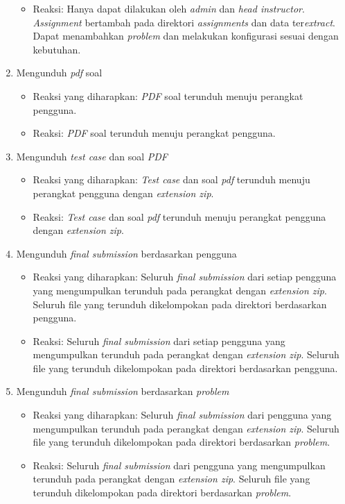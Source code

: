 \begin{enumerate}
\begin{itemize}
	 	\item Reaksi: Hanya dapat dilakukan oleh \textit{admin} dan \textit{head instructor}. \textit{Assignment} bertambah pada direktori \textit{assignments} dan data ter\textit{extract}. Dapat menambahkan \textit{problem} dan melakukan konfigurasi sesuai dengan kebutuhan.
	 \end{itemize}
	 \item Mengunduh \textit{pdf} soal
	 \begin{itemize}
	 	\item Reaksi yang diharapkan: \textit{PDF} soal terunduh menuju perangkat pengguna.
	 	\item Reaksi: \textit{PDF} soal terunduh menuju perangkat pengguna.
	 \end{itemize}
	 \item Mengunduh \textit{test case} dan soal \textit{PDF}
	 \begin{itemize}
	 	\item Reaksi yang diharapkan: \textit{Test case} dan soal \textit{pdf} terunduh menuju perangkat pengguna dengan \textit{extension zip}.
	 	\item Reaksi: \textit{Test case} dan soal \textit{pdf} terunduh menuju perangkat pengguna dengan \textit{extension zip}.
	 \end{itemize}
	 \item Mengunduh \textit{final submission} berdasarkan pengguna
	 \begin{itemize}
	 	\item Reaksi yang diharapkan: Seluruh \textit{final submission} dari setiap pengguna yang mengumpulkan terunduh pada perangkat dengan \textit{extension zip}. Seluruh file yang terunduh dikelompokan pada direktori berdasarkan pengguna.
	 	\item Reaksi: Seluruh \textit{final submission} dari setiap pengguna yang mengumpulkan terunduh pada perangkat dengan \textit{extension zip}. Seluruh file yang terunduh dikelompokan pada direktori berdasarkan pengguna.
	 \end{itemize}
	 \item Mengunduh \textit{final submission} berdasarkan \textit{problem}
	 \begin{itemize}
	 	\item Reaksi yang diharapkan: Seluruh \textit{final submission} dari pengguna yang mengumpulkan terunduh pada perangkat dengan \textit{extension zip}. Seluruh file yang terunduh dikelompokan pada direktori berdasarkan \textit{problem}.
	 	\item Reaksi: Seluruh \textit{final submission} dari pengguna yang mengumpulkan terunduh pada perangkat dengan \textit{extension zip}. Seluruh file yang terunduh dikelompokan pada direktori berdasarkan \textit{problem}.

\end{itemize}
\end{enumerate}
